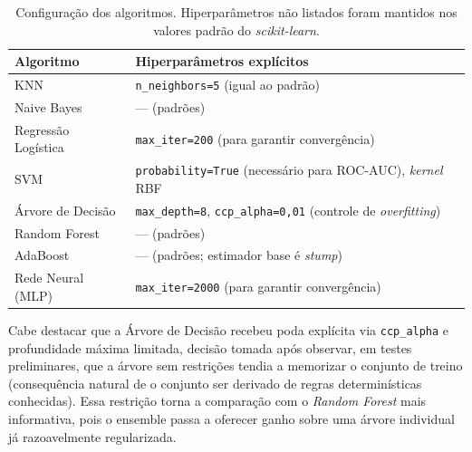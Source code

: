 \documentclass[11pt,a4paper]{article}
\newcommand{\code}[1]{\texttt{\small #1}}
\begin{document}
\begin{table}[H]
\centering
\caption{Configuração dos algoritmos. Hiperparâmetros não listados foram mantidos nos valores padrão do \textit{scikit-learn}.}
\label{tab:hiperparams}
\small
\begin{tabular}{ll}
\toprule
\textbf{Algoritmo} & \textbf{Hiperparâmetros explícitos} \\
\midrule
KNN                    & \code{n\_neighbors=5} (igual ao padrão) \\
Naive Bayes            & --- (padrões) \\
Regressão Logística    & \code{max\_iter=200} (para garantir convergência) \\
SVM                    & \code{probability=True} (necessário para ROC-AUC), \textit{kernel} RBF \\
Árvore de Decisão      & \code{max\_depth=8}, \code{ccp\_alpha=0{,}01} (controle de \textit{overfitting}) \\
Random Forest          & --- (padrões) \\
AdaBoost               & --- (padrões; estimador base é \textit{stump}) \\
Rede Neural (MLP)      & \code{max\_iter=2000} (para garantir convergência) \\
\bottomrule
\end{tabular}
\end{table}

Cabe destacar que a Árvore de Decisão recebeu poda explícita via \code{ccp\_alpha} e profundidade máxima limitada, decisão tomada após observar, em testes preliminares, que a árvore sem restrições tendia a memorizar o conjunto de treino (consequência natural de o conjunto ser derivado de regras determinísticas conhecidas). Essa restrição torna a comparação com o \textit{Random Forest} mais informativa, pois o ensemble passa a oferecer ganho sobre uma árvore individual já razoavelmente regularizada.
\end{document}
